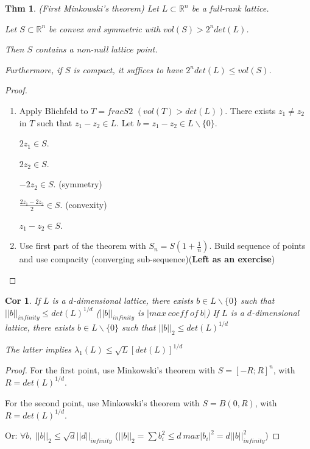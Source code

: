 \documentclass[11pt]{article}
\newtheorem{theorem}{Thm}
\newtheorem{corollary}{Cor}
\begin{document}
\begin{theorem} (First Minkowski's theorem)
Let $L \subset \mathbb{R}^n$ be a full-rank lattice.

Let $S \subset \mathbb{R}^n$ be convex and symmetric with $vol(S)>2^n det(L)$.

Then $S$ contains a non-null lattice point.

Furthermore, if $S$ is compact, it suffices to have $2^n det(L) \leq vol(S)$.
\end{theorem}

\begin{proof}
\begin{enumerate}
\item Apply Blichfeld to $T=frac{S}{2}$ $(vol(T)>det(L))$. There exists $z_1 \neq z_2$ in $T$ such that $z_1-z_2 \in L$. Let $b=z_1-z_2 \in L \backslash \{ 0 \}$.

$2 z_1 \in S$. 

$2 z_2 \in S$. 

$-2 z_2 \in S$. (symmetry) 

$\frac{2 z_1 - 2 z_2}{2} \in S$. (convexity) 

$z_1-z_2 \in S$.

\item Use first part of the theorem with $S_n = S (1+ \frac{1}{n})$. Build sequence of points and use compacity (converging sub-sequence)(\textbf{Left as an exercise})
\end{enumerate}
\end{proof}

\begin{corollary}
If $L$ is a $d$-dimensional lattice, there exists $b \in L \backslash \{ 0 \}$ such that $||b||_{ infinity} \leq det(L)^{1/d}$ ($||b||_{infinity}$ is $|max \ coeff \ of \ b|$)
If $L$ is a $d$-dimensional lattice, there exists $b \in L \backslash \{ 0 \}$ such that $||b||_2 \leq det(L)^{1/d}$

The latter implies $\lambda_1 (L) \leq \sqrt{L}[det(L)]^{1/d}$
\end{corollary}

\begin{proof}
For the first point, use Minkowski's theorem with $S=[-R;R]^n$, with $R=det(L)^{1/d}$.

For the second point, use Minkowski's theorem with $S=B(0,R)$, with $R=det(L)^{1/d}$.

Or: $\forall b, \ ||b||_2 \leq \sqrt{d} ||d||_{infinity}$ ($||b||_2 = \sum b_i^2 \leq d \ max |b_i|^2 = d ||b||_{infinity}^2$)
\end{proof}
\end{document}
